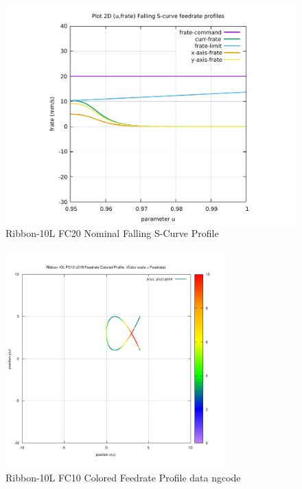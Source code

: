 \begin{figure}
	\caption     {Ribbon-10L FC20 Nominal Falling S-Curve Profile}
	\label{16-img-Ribbon-10L-FC20-Nominal-Falling-S-Curve-Profile.pdf}
	\includegraphics[width=1.00\textwidth]{Chap4/appendix/app-Ribbon-10L/plots/16-img-Ribbon-10L-FC20-Nominal-Falling-S-Curve-Profile.pdf}
\end{figure}

\clearpage
\pagebreak

\begin{figure}
	\caption     {Ribbon-10L FC10 Colored Feedrate Profile data ngcode}
	\label{17-img-Ribbon-10L-FC10-Colored-Feedrate-Profile-data_ngcode.png}
\includegraphics[width=0.75\textwidth]{Chap4/appendix/app-Ribbon-10L/plots/17-img-Ribbon-10L-FC10-Colored-Feedrate-Profile-data_ngcode.png}
\end{figure}


